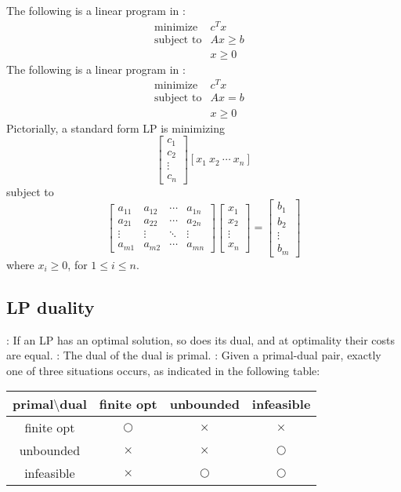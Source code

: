 \documentclass{myproc}
\begin{document}
\w The following is a linear program in :
	\begin{eqnarray*}
	\mbox{minimize} & c^Tx & \\
	\mbox{subject to} & Ax \ge b &\\
	& x \ge 0 &
	\end{eqnarray*}
\w The following is a linear program in :
	\begin{eqnarray*}
	\mbox{minimize} & c^Tx & \\
	\mbox{subject to} & Ax = b &\\
	& x \ge 0 &
	\end{eqnarray*}
\w Pictorially, a standard form LP is minimizing
\[
	\left[\begin{array}{c}c_1\\c_2\\ \vdots \\ c_n	\end{array}\right] 
                \left[x_1\ x_2\ \cdots\ x_n\right]
\]
subject to
\[
	\left[\begin{array}{llll}
	    a_{11} & a_{12} & \cdots & a_{1n}\\
	    a_{21} & a_{22} & \cdots & a_{2n}\\
            \vdots & \vdots & \ddots & \vdots\\
	    a_{m1} & a_{m2} & \cdots & a_{mn}
	      \end{array}\right]
	\left[\begin{array}{c}x_1\\x_2\\ \vdots \\ x_n	\end{array}\right] 
       = 
	\left[\begin{array}{c}b_1\\b_2\\ \vdots \\ b_m	\end{array}\right] 
 \]
where $x_i \ge 0$, for $1 \le i \le n$.
\eit
\subsection{LP duality}
\bit
{}: If an LP has an optimal solution, so does its dual, and at
optimality their costs are equal.
: The dual of the dual is primal.
: Given a primal-dual pair, exactly one of three situations
 occurs, as indicated in the following table:\vspace*{0.2cm}\\
  \begin{tabular}{|c|c|c|c|}\hline
    primal$\setminus$dual & finite opt & unbounded & infeasible \\ \hline
   finite opt & $\bigcirc$ & $\times$ &$\times$\\
   unbounded & $\times$ & $\times$ & $\bigcirc$\\
   infeasible & $\times$ & $\bigcirc$ & $\bigcirc$ \\ \hline
 	     \end{tabular}
\eit
\end{document}
